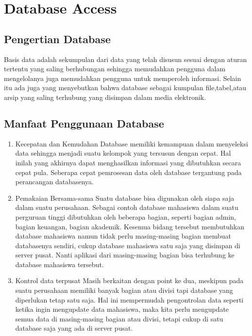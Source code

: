 
\section{Database Access}

\subsection{Pengertian Database}
	Basis data adalah sekumpulan dari data yang telah disusun sesuai dengan aturan tertentu yang saling berhubungan sehingga memudahkan pengguna dalam mengelolanya juga memudahkan pengguna untuk memperoleh informasi. Selain itu ada juga yang menyebutkan bahwa database sebagai kumpulan ﬁle,tabel,atau arsip yang saling terhubung yang disimpan dalam media elektronik.

\subsection {Manfaat Penggunaan Database}
	\begin{enumerate}
		\item Kecepatan dan Kemudahan 
			  Database memiliki kemampuan dalam menyeleksi data sehingga menjadi suatu kelompok yang tersusun dengan cepat. Hal inilah yang akhirnya dapat menghasilkan informasi yang dibutuhkan secara cepat pula. Seberapa cepat pemrosesan data oleh database tergantung pada perancangan databasenya.
     
		\item Pemakaian Bersama-sama 
			Suatu database bisa digunakan oleh siapa saja dalam suatu perusahaan. Sebagai contoh database mahasiswa dalam suatu perguruan tinggi dibutuhkan oleh beberapa bagian, seperti bagian admin, bagian keuangan, bagian akademik. Kesemua bidang tersebut membutuhkan database mahasiswa namun tidak perlu masing-masing bagian membuat databasenya sendiri, cukup database mahasiswa satu saja yang disimpan di server pusat. Nanti aplikasi dari masing-masing bagian bisa terhubung ke database mahasiswa tersebut. 
			
		\item Kontrol data terpusat 
Masih berkaitan dengan point ke dua, meskipun pada suatu perusahaan memiliki banyak bagian atau divisi tapi database yang diperlukan tetap satu saja. Hal ini mempermudah pengontrolan data seperti ketika ingin mengupdate data mahasiswa, maka kita perlu mengupdate semua data di masing-masing bagian atau divisi, tetapi cukup di satu database saja yang ada di server pusat. 
	\end{enumerate}

